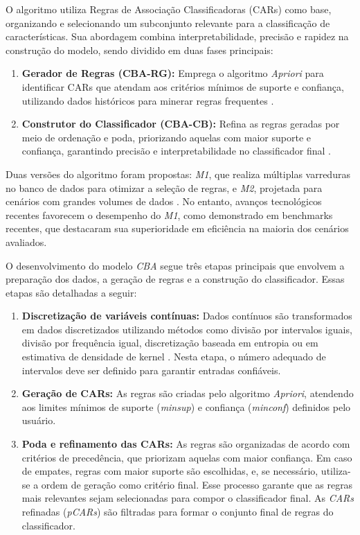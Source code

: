 \documentclass[12pt,a4paper]{article}
\begin{document}
O algoritmo utiliza Regras de Associação Classificadoras (CARs) como base, organizando e selecionando um subconjunto relevante para a classificação de características. Sua abordagem combina interpretabilidade, precisão e rapidez na construção do modelo, sendo dividido em duas fases principais:
\begin{enumerate}
    \item \textbf{Gerador de Regras (CBA-RG):} Emprega o algoritmo \textit{Apriori} para identificar CARs que atendam aos critérios mínimos de suporte e confiança, utilizando dados históricos para minerar regras frequentes \cite{kumi2021}.
    \item \textbf{Construtor do Classificador (CBA-CB):} Refina as regras geradas por meio de ordenação e poda, priorizando aquelas com maior suporte e confiança, garantindo precisão e interpretabilidade no classificador final \cite{filip2018}.
\end{enumerate}

Duas versões do algoritmo foram propostas: \textit{M1}, que realiza múltiplas varreduras no banco de dados para otimizar a seleção de regras, e \textit{M2}, projetada para cenários com grandes volumes de dados \cite{filip2018}. No entanto, avanços tecnológicos recentes favorecem o desempenho do \textit{M1}, como demonstrado em benchmarks recentes, que destacaram sua superioridade em eficiência na maioria dos cenários avaliados.

O desenvolvimento do modelo \textit{CBA} segue três etapas principais que envolvem a preparação dos dados, a geração de regras e a construção do classificador. Essas etapas são detalhadas a seguir:
\begin{enumerate}
    \item \textbf{Discretização de variáveis contínuas:} Dados contínuos são transformados em dados discretizados utilizando métodos como divisão por intervalos iguais, divisão por frequência igual, discretização baseada em entropia ou em estimativa de densidade de kernel \cite{liu2020}. Nesta etapa, o número adequado de intervalos deve ser definido para garantir entradas confiáveis.
    \item \textbf{Geração de CARs:} As regras são criadas pelo algoritmo \textit{Apriori}, atendendo aos limites mínimos de suporte (\textit{minsup}) e confiança (\textit{minconf}) definidos pelo usuário.
    \item \textbf{Poda e refinamento das CARs:} As regras são organizadas de acordo com critérios de precedência, que priorizam aquelas com maior confiança. Em caso de empates, regras com maior suporte são escolhidas, e, se necessário, utiliza-se a ordem de geração como critério final. Esse processo garante que as regras mais relevantes sejam selecionadas para compor o classificador final. As \textit{CARs} refinadas (\textit{pCARs}) são filtradas para formar o conjunto final de regras do classificador.
\end{enumerate}
\end{document}
